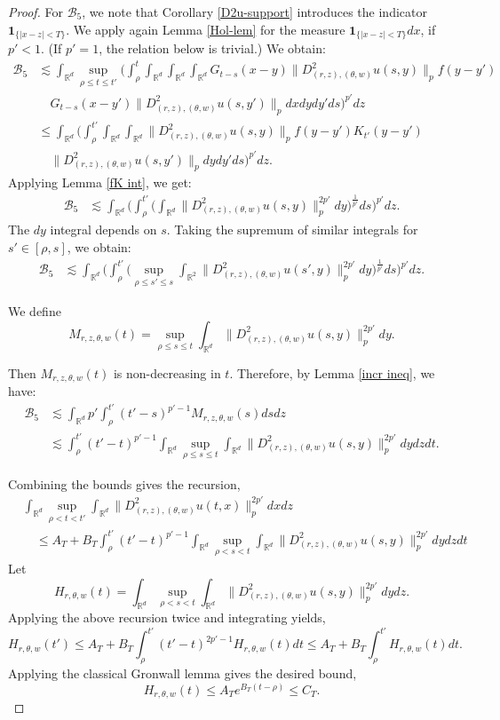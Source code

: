 \documentclass[10pt,a4paper]{amsart}
\def\bR{\mathbb{R}}
\def\cB{\mathcal{B}}
\newcommand{\les}{\lesssim}
\begin{document}
\begin{proof}
For $\cB_5$, we note that Corollary \ref{D2u-support} introduces the indicator $\mathbf 1_{\{|x-z| < T\}}$. We apply again Lemma \ref{Hol-lem} for the measure $\mathbf 1_{\{|x-z| < T\}}dx$, if $p'< 1$. (If $p'=1$, the relation below is trivial.) We obtain:
\begin{align*}
  \cB_5 & \les \int_{\bR^d} \sup_{\rho \leq t \leq t'}  \bigg(\int_\rho^t  \int_{\bR^d} \int_{\bR^d} \int_{\bR^d} G_{t-s}(x-y) \|D^2_{(r,z),(\theta,w)}u(s,y)\|_{p} f(y-y') \\
 & \quad G_{t-s}(x-y') \|D^2_{(r,z),(\theta,w)}u(s,y')\|_{p} dx dy dy' ds \bigg)^{p'} dz \\
 & \leq \int_{\bR^d} \bigg(\int_\rho^{t'}  \int_{\bR^d} \int_{\bR^d}  \|D^2_{(r,z),(\theta,w)}u(s,y)\|_{p} f(y-y')K_{t'}(y-y')  \\
 & \quad \|D^2_{(r,z),(\theta,w)}u(s,y')\|_{p} dy dy' ds \bigg)^{p'} dz.
\end{align*}
Applying Lemma \ref{fK int}, we get: %
\begin{align*}
  \cB_5 & \les \int_{\bR^d} \bigg(\int_\rho^{t'}  \bigg(\int_{\bR^d}  \|D^2_{(r,z),(\theta,w)}u(s,y)\|^{2p'}_{p} dy \bigg)^{\frac{1}{p'}} ds \bigg)^{p'} dz.
\end{align*}
The $dy$ integral depends on $s$. Taking the supremum of similar integrals for $s' \in [\rho,s]$, we obtain:
\begin{align*}
  \cB_5 & \les \int_{\bR^d} \bigg( \int_\rho^{t'}  \bigg(\sup_{\rho \leq s'\leq s} \int_{\bR^2}  \|D^2_{(r,z),(\theta,w)}u(s',y)\|^{2p'}_{p} dy \bigg)^{\frac{1}{p'}} ds \bigg)^{p'} dz. 
\end{align*}


We define $$M_{r,z,\theta,w}(t) = \sup_{\rho \leq s \leq t} \int_{\bR^d}  \|D^2_{(r,z),(\theta,w)}u(s,y)\|^{2p'}_{p} dy.$$ 

Then $M_{r,z,\theta,w}(t)$ is non-decreasing in $t$. Therefore, by Lemma \ref{incr ineq}, we have: 
\begin{align*}
  \cB_5 & \les  \int_{\bR^d} p'\int_\rho^{t'} (t'-s)^{p'-1} M_{r,z,\theta,w}(s) ds dz \\
  & \les \int_\rho^{t'} (t'-t)^{p'-1} \int_{\bR^d} \sup_{\rho \leq s \leq t} \int_{\bR^d}  \|D^2_{(r,z),(\theta,w)}u(s,y)\|^{2p'}_{p} dy dz dt.
\end{align*}

Combining the bounds gives the recursion, 
\begin{align*}
 & \int_{\bR^d} \sup_{\rho < t < t'} \int_{\bR^d} \|D^2_{(r,z),(\theta,w)}u(t,x)\|_{p}^{2p'} dx dz \\
 & \quad \leq A_T + B_T\int_\rho^{t'} (t'-t)^{p'-1} \int_{\bR^d} \sup_{\rho<s<t} \int_{\bR^d}  \|D^2_{(r,z),(\theta,w)}u(s,y)\|^{2p'}_{p} dy dz dt
\end{align*}
Let 
\[
 H_{r,\theta,w}(t) = \int_{\bR^d} \sup_{\rho<s<t} \int_{\bR^d}  \|D^2_{(r,z),(\theta,w)}u(s,y)\|^{2p'}_{p} dy dz.  
\]
Applying the above recursion twice and integrating yields, 
\[
H_{r,\theta,w}(t') \leq A_T + B_T \int_\rho^{t'} (t'-t)^{2p'-1} H_{r,\theta,w}(t)dt \leq   A_T + B_T \int_\rho^{t'} H_{r,\theta,w}(t)dt. 
\]
Applying the classical Gronwall lemma gives the desired bound, 
\[
 H_{r,\theta,w}(t) \leq A_Te^{B_T(t-\rho)} \leq C_T.
\]
\end{proof}
\end{document}
